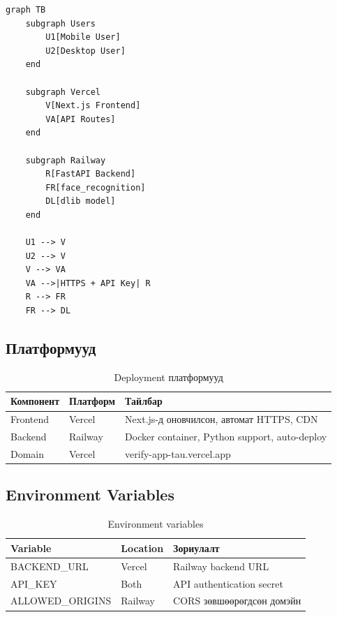 \documentclass[12pt,a4paper]{article}
\begin{document}
\begin{lstlisting}[caption={Deployment Architecture (Mermaid)}]
graph TB
    subgraph Users
        U1[Mobile User]
        U2[Desktop User]
    end
    
    subgraph Vercel
        V[Next.js Frontend]
        VA[API Routes]
    end
    
    subgraph Railway
        R[FastAPI Backend]
        FR[face_recognition]
        DL[dlib model]
    end
    
    U1 --> V
    U2 --> V
    V --> VA
    VA -->|HTTPS + API Key| R
    R --> FR
    FR --> DL
\end{lstlisting}

\subsection{Платформууд}

\begin{table}[H]
\centering
\begin{tabular}{|p{3cm}|p{3cm}|p{6.5cm}|}
\hline
\textbf{Компонент} & \textbf{Платформ} & \textbf{Тайлбар} \\
\hline
Frontend & Vercel & Next.js-д оновчилсон, автомат HTTPS, CDN \\
\hline
Backend & Railway & Docker container, Python support, auto-deploy \\
\hline
Domain & Vercel & verify-app-tau.vercel.app \\
\hline
\end{tabular}
\caption{Deployment платформууд}
\end{table}

\subsection{Environment Variables}

\begin{table}[H]
\centering
\begin{tabular}{|p{3.5cm}|p{3cm}|p{6cm}|}
\hline
\textbf{Variable} & \textbf{Location} & \textbf{Зориулалт} \\
\hline
BACKEND\_URL & Vercel & Railway backend URL \\
\hline
API\_KEY & Both & API authentication secret \\
\hline
ALLOWED\_ORIGINS & Railway & CORS зөвшөөрөгдсөн домэйн \\
\hline
\end{tabular}
\caption{Environment variables}
\end{table}
\end{document}
